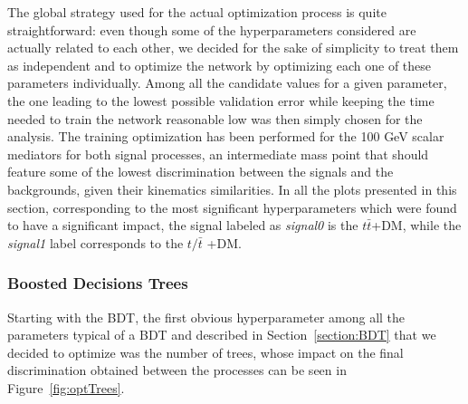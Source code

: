\documentclass[a4paper, 10pt, openright]{report}
\begin{document}
\begin{appendices}
The global strategy used for the actual optimization process is quite straightforward: even though some of the hyperparameters considered are actually related to each other, we decided for the sake of simplicity to treat them as independent and to optimize the network by optimizing each one of these parameters individually. Among all the candidate values for a given parameter, the one leading to the lowest possible validation error while keeping the time needed to train the network reasonable low was then simply chosen for the analysis. The training optimization has been performed for the 100 GeV scalar mediators for both signal processes, an intermediate mass point that should feature some of the lowest discrimination between the signals and the backgrounds, given their kinematics similarities. In all the plots presented in this section, corresponding to the most significant hyperparameters which were found to have a significant impact, the signal labeled as \textit{signal0} is the $t \bar t$+DM, while the \textit{signal1} label corresponds to the $t/\bar t$ +DM.

\subsubsection{Boosted Decisions Trees}

Starting with the \ac{BDT}, the first obvious hyperparameter among all the parameters typical of a \ac{BDT} and described in Section~\ref{section:BDT} that we decided to optimize was the number of trees, whose impact on the final discrimination obtained between the processes can be seen in Figure~\ref{fig:optTrees}.


\end{appendices}
\end{document}
